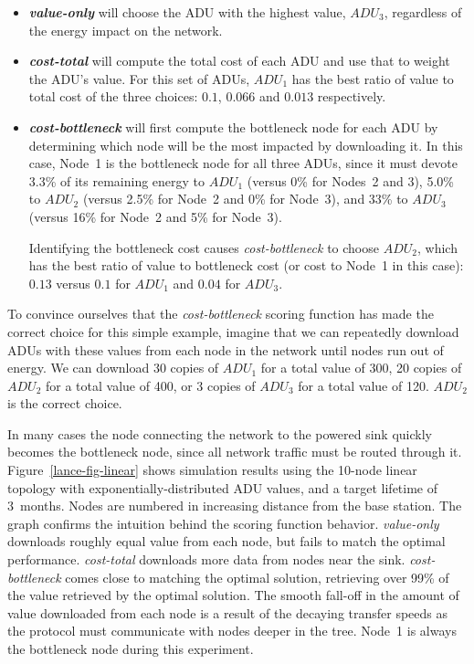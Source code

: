 \begin{itemize}

\item \textbf{\textit{value-only}} will choose the ADU with the highest
value, $ADU_3$, regardless of the energy impact on the network.

\item \textbf{\textit{cost-total}} will compute the total cost of each ADU
and use that to weight the ADU's value. For this set of ADUs, $ADU_1$ has the
best ratio of value to total cost of the three choices: $0.1$, $0.066$ and
$0.013$ respectively.

\item \textbf{\textit{cost-bottleneck}} will first compute the bottleneck
node for each ADU by determining which node will be the most impacted by
downloading it. In this case, Node~1 is the bottleneck node for all three
ADUs, since it must devote 3.3\% of its remaining energy to $ADU_1$ (versus
0\% for Nodes~2 and 3), 5.0\% to $ADU_2$ (versus 2.5\% for Node~2 and 0\% for
Node~3), and 33\% to $ADU_3$ (versus 16\% for Node~2 and 5\% for Node~3).

\hspace{0.25in} Identifying the bottleneck cost causes
\textit{cost-bottleneck} to choose $ADU_2$, which has the best ratio of value
to  bottleneck cost (or cost to Node~1 in this case): $0.13$ versus $0.1$ for
$ADU_1$ and $0.04$ for $ADU_3$.

\end{itemize}

To convince ourselves that the \textit{cost-bottleneck} scoring function has
made the correct choice for this simple example, imagine that we can
repeatedly download ADUs with these values from each node in the network
until nodes run out of energy. We can download 30 copies of $ADU_1$ for a
total value of 300, 20 copies of $ADU_2$ for a total value of 400, or 3
copies of $ADU_3$ for a total value of 120. $ADU_2$ is the correct choice.

In many cases the node connecting the network to the powered sink quickly
becomes the bottleneck node, since all network traffic must be routed through
it. Figure~\ref{lance-fig-linear} shows simulation results using the 10-node
linear topology with exponentially-distributed ADU values, and a target
lifetime of 3~months. Nodes are numbered in increasing distance from the base
station. The graph confirms the intuition behind the scoring function
behavior. \textit{value-only} downloads roughly equal value from each node,
but fails to match the optimal performance. \textit{cost-total} downloads
more data from nodes near the sink. \textit{cost-bottleneck} comes close to
matching the optimal solution, retrieving over 99\% of the value retrieved by
the optimal solution. The smooth fall-off in the amount of value downloaded
from each node is a result of the decaying transfer speeds as the protocol
must communicate with nodes deeper in the tree. Node~1 is always the
bottleneck node during this experiment.

